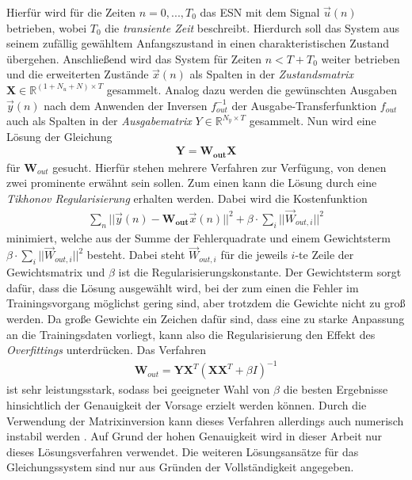 Hierfür wird für die Zeiten $n=0, ..., T_0$ das \textsc{ESN} mit dem Signal $\vec{u}(n)$ betrieben, wobei $T_0$ die \textit{transiente Zeit} beschreibt. Hierdurch soll das System aus seinem zufällig gewähltem Anfangszustand in einen charakteristischen Zustand übergehen. Anschließend wird das System für Zeiten $n < T + T_0$ weiter betrieben und die erweiterten Zustände $\vec{x}(n)$ als Spalten in der \textit{Zustandsmatrix} $\mathbf{X} \in \mathbb{R}^{(1 + N_u + N) \times T}$ gesammelt. Analog dazu werden die gewünschten Ausgaben $\vec{y}(n)$ nach dem Anwenden der Inversen $f^{-1}_{out}$ der Ausgabe-Transferfunktion $f_{out}$ auch als Spalten in der \textit{Ausgabematrix} $Y \in \mathbb{R}^{N_y \times T}$ gesammelt.
Nun wird eine Lösung der Gleichung
\begin{align}
\mathbf{Y} = \mathbf{W_{out}} \mathbf{X}
\end{align}
für $\mathbf{W}_{out}$ gesucht. Hierfür stehen mehrere Verfahren zur Verfügung, von denen zwei prominente erwähnt sein sollen.
Zum einen kann die Lösung durch eine \textit{Tikhonov Regularisierung} erhalten werden. Dabei wird die Kostenfunktion 
\begin{align}
\sum_n ||\vec{y}(n) - \mathbf{W_{out}}\vec{x}(n)||^2 + \beta \cdot \sum_i ||\vec{W}_{out, i}||^2
\end{align}
minimiert, welche aus der Summe der Fehlerquadrate und einem Gewichtsterm $\beta \cdot \sum_i ||\vec{W}_{out, i}||^2$ besteht. Dabei steht $\vec{W}_{out, i}$ für die jeweils $i$-te Zeile der Gewichtsmatrix und $\beta$ ist die Regularisierungskonstante. Der Gewichtsterm sorgt dafür, dass die Lösung ausgewählt wird, bei der zum einen die Fehler im Trainingsvorgang möglichst gering sind, aber trotzdem die Gewichte nicht zu groß werden. Da große Gewichte ein Zeichen dafür sind, dass eine zu starke Anpassung an die Trainingsdaten vorliegt, kann also die Regularisierung den Effekt des \textit{Overfittings} unterdrücken. Das Verfahren
\begin{align}
\label{eq:tikhonov}
\mathbf{W}_{out} = \mathbf{Y} \mathbf{X}^T \left(\mathbf{X} \mathbf{X}^T + \beta I \right)^{-1}
\end{align}
ist sehr leistungsstark, sodass bei geeigneter Wahl von $\beta$ die besten Ergebnisse hinsichtlich der Genauigkeit der Vorsage erzielt werden können. Durch die Verwendung der Matrixinversion kann dieses Verfahren allerdings auch numerisch instabil werden \cite{lukoseviciusa2009}. Auf Grund der hohen Genauigkeit wird in dieser Arbeit nur dieses Lösungsverfahren verwendet. Die weiteren Lösungsansätze für das Gleichungssystem sind nur aus Gründen der Vollständigkeit angegeben.\\

